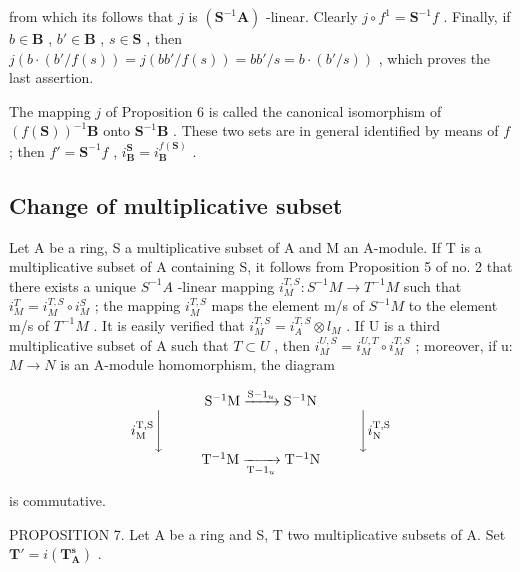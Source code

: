 from which its follows that \(j\) is \((\mathbf{S}^{-1}\mathbf{A})\) -linear. Clearly \(j \circ f^1 = \mathbf{S}^{-1}f\) . Finally, if \(b \in \mathbf{B}\) , \(b' \in \mathbf{B}\) , \(s \in \mathbf{S}\) , then \(j(b \cdot (b'/f(s)) = j(bb'/f(s)) = bb'/s = b \cdot (b'/s))\) , which proves the last assertion.

The mapping \(j\) of Proposition 6 is called the canonical isomorphism of \((f(\mathbf{S}))^{-1}\mathbf{B}\) onto \(\mathbf{S}^{-1}\mathbf{B}\) . These two sets are in general identified by means of \(f\) ; then \(f' = \mathbf{S}^{-1}f\) , \(i_{\mathbf{B}}^{\mathbf{S}} = i_{\mathbf{B}}^{f(\mathbf{S})}\) .

\subsection{Change of multiplicative subset}

Let A be a ring, S a multiplicative subset of A and M an A-module. If T is a multiplicative subset of A containing S, it follows from Proposition 5 of no. 2 that there exists a unique \(S^{-1}A\) -linear mapping \(i_{M}^{T,S}:S^{-1}M\to T^{-1}M\) such that \(i_{M}^{T}=i_{M}^{T,S}\circ i_{M}^{S}\) ; the mapping \(i_{M}^{T,S}\) maps the element m/s of \(S^{-1}M\) to the element m/s of \(T^{-1}M\) . It is easily verified that \(i_{M}^{T,S}=i_{A}^{T,S}\otimes l_{M}\) . If U is a third multiplicative subset of A such that \(T\subset U\) , then \(i_{M}^{U,S}=i_{M}^{U,T}\circ i_{M}^{T,S}\) ; moreover, if u: \(M\to N\) is an A-module homomorphism, the diagram

\[
\begin{array}{c} \mathrm{S} ^ {- 1} \mathrm{M} \xrightarrow {\mathrm{S} - 1 _ {u}} \mathrm{S} ^ {- 1} \mathrm{N} \\ i _ {\mathrm{M}} ^ {\mathrm{T}, \mathrm{S}} \Biggl \downarrow \qquad \qquad \qquad \qquad \qquad \qquad \qquad \Biggl \downarrow i _ {\mathrm{N}} ^ {\mathrm{T}, \mathrm{S}} \\ \mathrm{T} ^ {- 1} \mathrm{M} \xrightarrow [ \mathrm{T} - 1 _ {u} ]{} \mathrm{T} ^ {- 1} \mathrm{N} \end{array}
\]

is commutative.

PROPOSITION 7. Let A be a ring and S, T two multiplicative subsets of A. Set \(\mathbf{T}' = i(\mathbf{T}_{\mathbf{A}}^{\mathbf{s}})\) .

